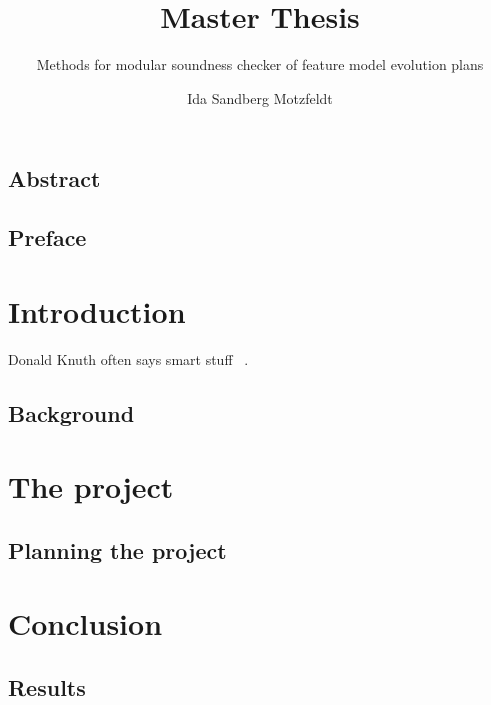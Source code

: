\documentclass[a4paper,english]{ifimaster}
\title{Master Thesis}
\subtitle{Methods for modular soundness checker of feature model evolution plans}
\author{Ida Sandberg Motzfeldt}
\begin{document}
\duoforside[dept={Department of Informatics},
program={Informatics: Programming and System Architecture},
            option={Software},
long]

\frontmatter{}
\chapter*{Abstract}

\tableofcontents{}
\listoffigures{}
\listoftables{}

\chapter*{Preface}

\mainmatter{}
\part{Introduction}

Donald Knuth often says smart stuff ~\parencite{Knuth:2007:CPA:1283920.1283929}.

\chapter{Background}

\part{The project}



\chapter{Planning the project}

\part{Conclusion}

\chapter{Results}

\backmatter{}

\printbibliography
\end{document}
